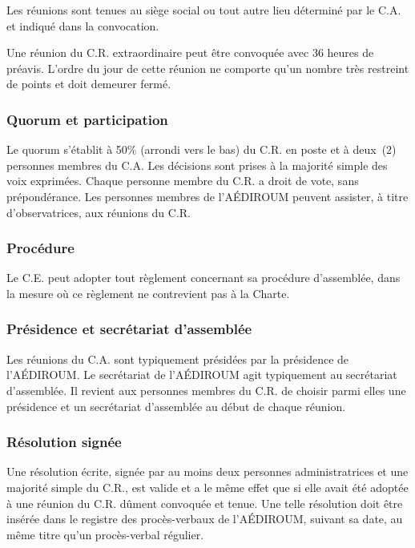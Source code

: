 \documentclass{aediroum}
\begin{document}
Les réunions sont tenues au siège social ou tout autre lieu déterminé par le C.A. et indiqué dans la convocation.

Une réunion du C.R. extraordinaire peut être convoquée avec 36 heures de préavis. L'ordre du jour de cette réunion ne comporte qu'un nombre très restreint de points et doit demeurer fermé.

\subsubsection{Quorum et participation}\label{sec:quorum-et-participation}

Le quorum s'établit à 50\% (arrondi vers le bas) du C.R. en poste et à deux~(2) personnes membres du C.A. Les décisions sont prises à la majorité simple des voix exprimées. Chaque personne membre du C.R. a droit de vote, sans prépondérance. Les personnes membres de l'AÉDIROUM peuvent assister, à titre d'observatrices, aux réunions du C.R.

\subsubsection{Procédure}\label{sec:procedure-admin}

Le C.E. peut adopter tout règlement concernant sa procédure d'assemblée, dans la mesure où ce règlement ne contrevient pas à la Charte.

\subsubsection{Présidence et secrétariat d'assemblée}\label{sec:president-et-secretaire-dassemblee}

Les réunions du C.A. sont typiquement présidées par la présidence de l'AÉDIROUM. Le secrétariat de l'AÉDIROUM agit typiquement au secrétariat d’assemblée. Il revient aux personnes membres du C.R. de choisir parmi elles une présidence et un secrétariat d'assemblée au début de chaque réunion.

\subsubsection{Résolution signée}\label{sec:resolution-signee}

Une résolution écrite, signée par au moins deux personnes administratrices et une majorité simple du C.R., est valide et a le même effet que si elle avait été adoptée à une réunion du C.R. dûment convoquée et tenue. Une telle résolution doit être insérée dans le registre des procès-verbaux de l'AÉDIROUM, suivant sa date, au même titre qu'un procès-verbal régulier.
\end{document}

